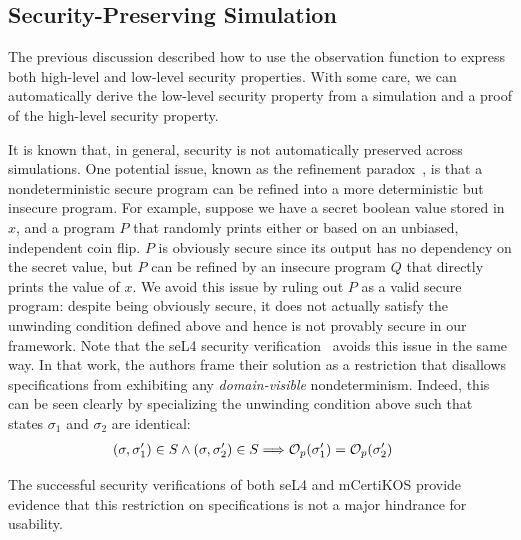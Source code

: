 \subsection{Security-Preserving Simulation}
\label{informal-simulation}

The previous discussion described how to use the observation function to 
express both high-level and low-level security properties. 
With some care, we can automatically derive the low-level security property 
from a simulation and a proof of the high-level security property.

It is known that, in general, security is not automatically preserved across 
simulations. One potential issue, known as the refinement 
paradox~\cite{jurjens,morgan09,morgan12}, is that a nondeterministic secure
program can be refined into a more deterministic but insecure program. For
example, suppose we have a secret boolean value stored in $x$, and a 
program $P$ that randomly prints either  or  based
on an unbiased, independent coin flip. $P$
is obviously secure since its output has no dependency on the secret
value, but $P$ can be refined by an insecure program $Q$ that directly 
prints the value of $x$. We avoid this issue by ruling out $P$ as a valid
secure program: despite being obviously secure, it does not actually
satisfy the unwinding condition defined above and hence is not
provably secure in our framework. Note that the seL4 security 
verification~\cite{murray12} avoids this issue in the same way. In
that work, the authors frame their solution as a restriction 
that disallows specifications from exhibiting any \emph{domain-visible} 
nondeterminism. Indeed, this can be seen
clearly by specializing the unwinding condition above such that
states $\sigma_1$ and $\sigma_2$ are identical:
{\small
\begin{align*}
& (\sigma,\sigma_1') \in S \land (\sigma,\sigma_2') \in S 
\Longrightarrow
\mathcal{O}_{p}(\sigma_1') = \mathcal{O}_{p}(\sigma_2')
\end{align*}}%

The successful security verifications of both seL4 and mCerti\-KOS 
provide evidence that this restriction on specifications
is not a major hindrance for usability.

